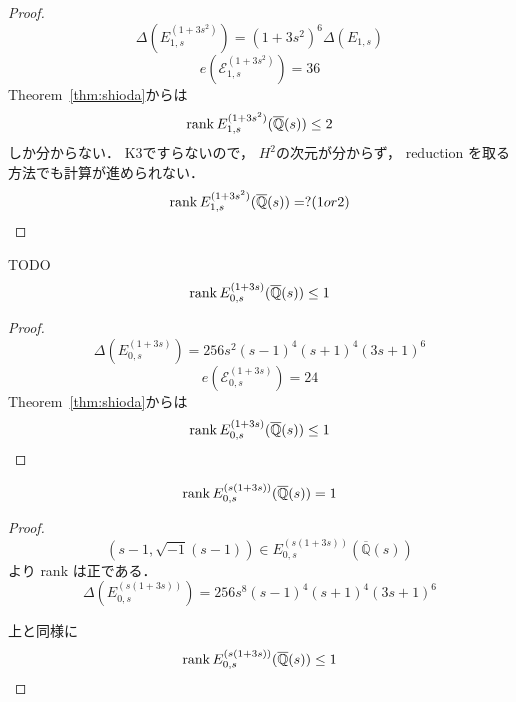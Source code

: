 \documentclass[main]{subfiles}
\begin{document}
\begin{proof}
    \begin{equation}
        \Delta(E_{1,s}^{(1 + 3s^{2})}) = (1 + 3s^{2})^{6} \Delta(E_{1,s})
    \end{equation}
    \begin{equation}
        e(\mathcal{E}_{1,s}^{(1 + 3s^{2})}) = 36
    \end{equation}
    Theorem~\ref{thm:shioda}からは
    \begin{equation}
        \operatorname{rank} E_{1,s}^{(1 + 3s^{2})}(\overline{\mathbb{Q}}(s)) \leq 2
    \end{equation}
    しか分からない．
    K3ですらないので， $H^2$の次元が分からず， reduction を取る方法でも計算が進められない．
    \begin{equation}
        \operatorname{rank} E_{1,s}^{(1 + 3s^{2})}(\overline{\mathbb{Q}}(s)) = ? (1 or 2)
    \end{equation}
\end{proof}


\begin{thm}
    TODO
    \begin{equation}
        \operatorname{rank} E_{0,s}^{(1 + 3s)}(\overline{\mathbb{Q}}(s)) \leq 1
    \end{equation}
\end{thm}
\begin{proof}
    \begin{equation}
        \Delta(E_{0,s}^{(1 + 3s)}) = 256s^{2}(s - 1)^{4}(s + 1)^{4}(3s + 1)^{6}
    \end{equation}
    \begin{equation}
        e(\mathcal{E}_{0,s}^{(1 + 3s)}) = 24
    \end{equation}
    Theorem~\ref{thm:shioda}からは
    \begin{equation}
        \operatorname{rank} E_{0,s}^{(1 + 3s)}(\overline{\mathbb{Q}}(s)) \leq 1
    \end{equation}
\end{proof}

\begin{thm}
    \begin{equation}
        \operatorname{rank} E_{0,s}^{(s(1 + 3s))}(\overline{\mathbb{Q}}(s)) = 1
    \end{equation}
\end{thm}
\begin{proof}
    \begin{equation}
        (s - 1, \sqrt{-1}(s - 1)) \in E_{0,s}^{(s(1 + 3s))}(\overline{\mathbb{Q}}(s))
    \end{equation}
    より rank は正である．
    \begin{equation}
        \Delta(E_{0,s}^{(s(1 + 3s))}) = 256s^{8}(s - 1)^{4}(s + 1)^{4}(3s + 1)^{6}
    \end{equation}

    上と同様に
    \begin{equation}
        \operatorname{rank} E_{0,s}^{(s(1 + 3s))}(\overline{\mathbb{Q}}(s)) \leq 1
    \end{equation}
\end{proof}
\end{document}
